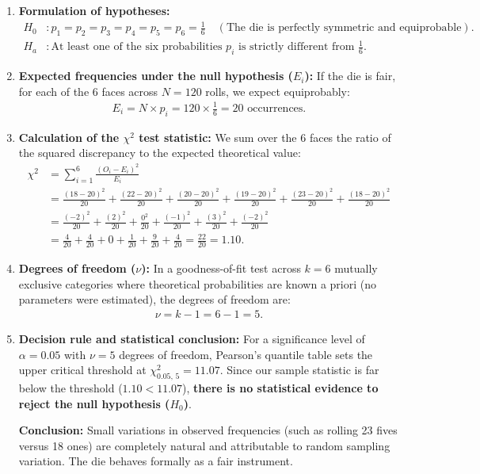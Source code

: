 \begin{solproblema}
	\begin{enumerate}
		\item \textbf{Formulation of hypotheses:}
		\begin{align}
			H_0&: p_1 = p_2 = p_3 = p_4 = p_5 = p_6 = \frac{1}{6} \quad (\text{The die is perfectly symmetric and equiprobable}). \\
			H_a&: \text{At least one of the six probabilities } p_i \text{ is strictly different from } \frac{1}{6}.
		\end{align}
		
		\item \textbf{Expected frequencies under the null hypothesis ($E_i$):}
		If the die is fair, for each of the 6 faces across $N = 120$ rolls, we expect equiprobably:
		\begin{align}
			E_i = N \times p_i = 120 \times \frac{1}{6} = 20 \text{ occurrences.}
		\end{align}
		
		\item \textbf{Calculation of the $\chi^2$ test statistic:}
		We sum over the 6 faces the ratio of the squared discrepancy to the expected theoretical value:
		\begin{align}
			\chi^2 &= \sum_{i=1}^6 \frac{(O_i - E_i)^2}{E_i} \\
			&= \frac{(18-20)^2}{20} + \frac{(22-20)^2}{20} + \frac{(20-20)^2}{20} + \frac{(19-20)^2}{20} + \frac{(23-20)^2}{20} + \frac{(18-20)^2}{20} \\
			&= \frac{(-2)^2}{20} + \frac{(2)^2}{20} + \frac{0^2}{20} + \frac{(-1)^2}{20} + \frac{(3)^2}{20} + \frac{(-2)^2}{20} \\
			&= \frac{4}{20} + \frac{4}{20} + 0 + \frac{1}{20} + \frac{9}{20} + \frac{4}{20} = \frac{22}{20} = 1.10.
		\end{align}
		
		\item \textbf{Degrees of freedom ($\nu$):}
		In a goodness-of-fit test across $k = 6$ mutually exclusive categories where theoretical probabilities are known a priori (no parameters were estimated), the degrees of freedom are:
		\begin{align}
			\nu = k - 1 = 6 - 1 = 5.
		\end{align}
		
		\item \textbf{Decision rule and statistical conclusion:}
		For a significance level of $\alpha = 0.05$ with $\nu = 5$ degrees of freedom, Pearson's quantile table sets the upper critical threshold at $\chi^2_{0.05, \, 5} = 11.07$.
		Since our sample statistic is far below the threshold ($1.10 < 11.07$), \textbf{there is no statistical evidence to reject the null hypothesis ($H_0$)}.
		
		\textbf{Conclusion:} Small variations in observed frequencies (such as rolling 23 fives versus 18 ones) are completely natural and attributable to random sampling variation. The die behaves formally as a fair instrument.
	\end{enumerate}
\end{solproblema}

